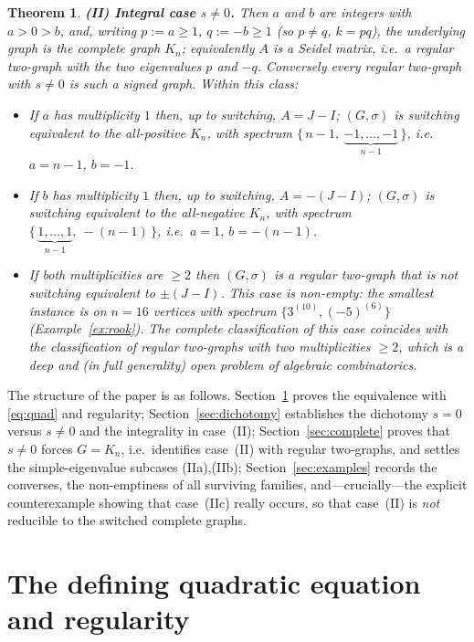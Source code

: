 \documentclass{amsart}
\newtheorem{theorem}{Theorem}
\theoremstyle{definition}
\begin{document}
\begin{theorem}
\smallskip
\textbf{(II) Integral case $s\ne 0$.}
Then $a$ and $b$ are integers with $a>0>b$, and, writing $p:=a\ge1$,
$q:=-b\ge1$ (so $p\ne q$, $k=pq$), the underlying graph is the complete graph
$K_n$; equivalently $A$ is a Seidel matrix, i.e.\ a regular two-graph with the
two eigenvalues $p$ and $-q$. Conversely every regular two-graph with $s\ne0$
is such a signed graph. Within this class:
\begin{itemize}
\item[(IIa)] If $a$ has multiplicity $1$ then, up to switching, $A=J-I$;
$(G,\sigma)$ is switching equivalent to the all-positive $K_n$, with spectrum
$\{\,n-1,\ \underbrace{-1,\dots,-1}_{n-1}\,\}$, i.e.\ $a=n-1$, $b=-1$.
\item[(IIb)] If $b$ has multiplicity $1$ then, up to switching, $A=-(J-I)$;
$(G,\sigma)$ is switching equivalent to the all-negative $K_n$, with spectrum
$\{\,\underbrace{1,\dots,1}_{n-1},\ -(n-1)\,\}$, i.e.\ $a=1$, $b=-(n-1)$.
\item[(IIc)] If both multiplicities are $\ge2$ then $(G,\sigma)$ is a regular
two-graph that is \emph{not} switching equivalent to $\pm(J-I)$. This case is
non-empty: the smallest instance is on $n=16$ vertices with spectrum
$\{3^{(10)},(-5)^{(6)}\}$ (Example~\ref{ex:rook}). The complete classification
of this case coincides with the classification of regular two-graphs with two
multiplicities $\ge2$, which is a deep and (in full generality) open problem of
algebraic combinatorics.
\end{itemize}
\end{theorem}

The structure of the paper is as follows. Section~\ref{sec:quad} proves the
equivalence with \eqref{eq:quad} and regularity; Section~\ref{sec:dichotomy}
establishes the dichotomy $s=0$ versus $s\ne0$ and the integrality in
case~(II); Section~\ref{sec:complete} proves that $s\ne0$ forces $G=K_n$, i.e.\
identifies case~(II) with regular two-graphs, and settles the simple-eigenvalue
subcases (IIa),(IIb); Section~\ref{sec:examples} records the converses, the
non-emptiness of all surviving families, and---crucially---the explicit
counterexample showing that case~(IIc) really occurs, so that case~(II) is
\emph{not} reducible to the switched complete graphs.

\section{The defining quadratic equation and regularity}\label{sec:quad}
\end{document}
